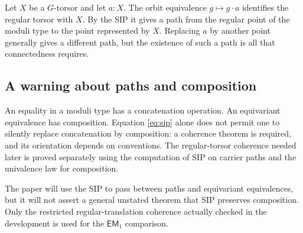 \begin{example}
Let $X$ be a $G$-torsor and let $a:X$. The orbit equivalence $g\mapsto g\cdot a$ identifies the regular torsor with $X$. By the SIP it gives a path from the regular point of the moduli type to the point represented by $X$. Replacing $a$ by another point generally gives a different path, but the existence of such a path is all that connectedness requires.
\end{example}

\subsection{A warning about paths and composition}
An equality in a moduli type has a concatenation operation. An equivariant equivalence has composition. Equation \eqref{eq:sip} alone does not permit one to silently replace concatenation by composition: a coherence theorem is required, and its orientation depends on conventions. The regular-torsor coherence needed later is proved separately using the computation of SIP on carrier paths and the univalence law for composition.

\begin{warning}
The paper will use the SIP to pass between paths and equivariant equivalences, but it will not assert a general unstated theorem that SIP preserves composition. Only the restricted regular-translation coherence actually checked in the development is used for the $\mathsf{EM}_1$ comparison.
\end{warning}
